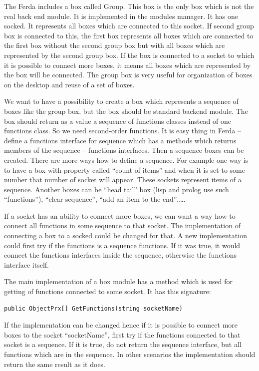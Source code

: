 \documentclass[a4paper,12pt]{book}
\begin{document}
The Ferda includes a box called Group. This box is the only box which is not the real back end module. It is implemented in the modules manager. It has one socked. It represents all boxes which are connected to this socket. If second group box is connected to this, the first box represents all boxes which are connected to the first box without the second group box but with all boxes which are represented by the second group box. If the box is connected to a socket to which it is possible to connect more boxes, it means all boxes which are represented by the box will be connected. The group box is very useful for organization of boxes on the desktop and reuse of a set of boxes.

We want to have a possibility to create a box which represents a sequence of boxes like the group box, but the box should be standard backend module. The box should return as a value a sequence of functions classes instead of one functions class. So we need second-order functions. It is easy thing in Ferda -- define a functions interface for sequence which has a methods which returns members of the sequence -- functions interfaces. Then a sequence boxes can be created. There are more ways how to define a sequence. For example one way is to have a box with property called ``count of items'' and when it is set to some number that number of socket will appear. These sockets represent items of a sequence. Another boxes can be ``head tail'' box (lisp and prolog use such ``functions''), ``clear sequence'',  ``add an item to the end'',\dots.

If a socket has an ability to connect more boxes, we can want a way how to connect all functions in some sequence to that socket. The implementation of connecting a box to a socked could be changed for that. A new implementation could first try if the functions is a sequence functions. If it was true, it would connect the functions interfaces inside the sequence, otherwise the functions interface itself.

The main implementation of a box module has a method which is used for getting of functions connected to some socket. It has this signature:
\begin{verbatim}
public ObjectPrx[] GetFunctions(string socketName)
\end{verbatim}

If the implementation can be changed hence if it is possible to connect more boxes to the socket ``socketName'', first try if the functions connected to that socket is a sequence. If it is true, do not return the sequence interface, but all functions which are in the sequence. In other scenarios the implementation should return the same result as it does.
\end{document}
